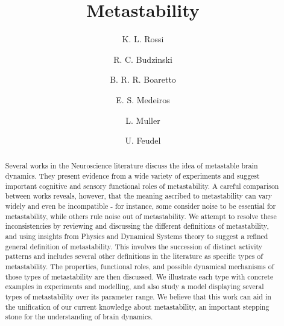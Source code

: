 \documentclass[preprint,superscriptaddress,showpacs,amsmath,amssymb,aps,pre,floatfix]{revtex4-1}
\theoremstyle{definition}
\begin{document}
\title{Metastability}
\author{K. L. Rossi}
\author{R. C. Budzinski}
\author{B. R. R. Boaretto}
\author{E. S. Medeiros}
\author{L. Muller}
\author{U. Feudel}




\begin{abstract}
Several works in the Neuroscience literature discuss the idea of metastable brain dynamics. They present evidence from a wide variety of experiments and suggest important cognitive and sensory functional roles of metastability. A careful comparison between works reveals, however, that the meaning ascribed to metastability can vary widely and even be incompatible - for instance, some consider noise to be essential for metastability, while others rule noise out of metastability. We attempt to resolve these inconsistencies by reviewing and discussing the different definitions of metastability, and using insights from Physics and Dynamical Systems theory to suggest a refined general definition of metastability. This involves the succession of distinct activity patterns and includes several other definitions in the literature as specific types of metastability. The properties, functional roles, and possible dynamical mechanisms of those types of metastability are then discussed. We illustrate each type with concrete examples in experiments and modelling, and also study a model displaying several types of metastability over its parameter range. We believe that this work can aid in the unification of our current knowledge about metastability, an important stepping stone for the understanding of brain dynamics.   
\end{abstract}
\end{document}
